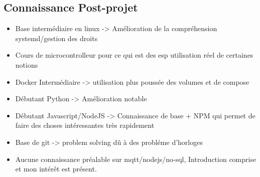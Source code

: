 \subsection{ Connaissance Post-projet }
     \begin{itemize}
        \item Base intermédiaire en linux -> Amélioration de la compréhension systemd/gestion des droits 
        \item Cours de microcontrolleur pour ce qui est des esp utilisation réel de certaines notions
        \item Docker Intermédiaire -> utilisation plus poussée des volumes et de compose
        \item Débutant Python -> Amélioration notable
        \item Débutant Javascript/NodeJS -> Connaissance de base + NPM qui permet de faire des choses intéressantes très rapidement
        \item Base de git -> problem solving dû à des probléme d'horloges
        \item Aucune connaissance préalable sur mqtt/nodejs/no-sql, Introduction comprise et mon intérêt est présent.
    \end{itemize}
